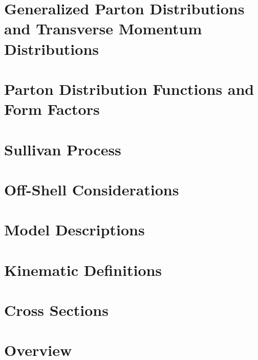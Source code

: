 \documentclass[
]{report}
\begin{document}
\hypertarget{Section-2.2}{%
\section{Generalized Parton Distributions and Transverse Momentum
Distributions}\label{Section-2.2}}

\hypertarget{Section-2.3}{%
\section{Parton Distribution Functions and Form
Factors}\label{Section-2.3}}

\label{Chapter-3}

\hypertarget{Section-3.1}{%
\section{Sullivan Process}\label{Section-3.1}}

\hypertarget{Section-3.2}{%
\section{Off-Shell Considerations}\label{Section-3.2}}

\hypertarget{Section-3.3}{%
\section{Model Descriptions}\label{Section-3.3}}

\label{Chapter-4}

\hypertarget{Section-4.1}{%
\section{Kinematic Definitions}\label{Section-4.1}}

\hypertarget{Section-4.2}{%
\section{Cross Sections}\label{Section-4.2}}

\label{Chapter-5}

\hypertarget{Section-5.1}{%
\section{Overview}\label{Section-5.1}}
\end{document}
